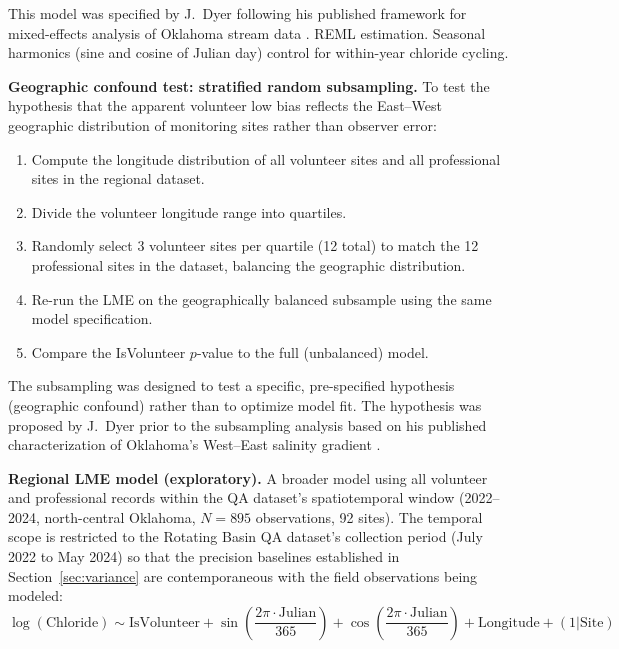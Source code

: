 \documentclass[lineno]{wlpeerj}
\begin{document}
This model was specified by J.\ Dyer \citep[personal communication, February 2026;][]{Dyer2026} following his published framework for mixed-effects analysis of Oklahoma stream data \citep{Dyer2025}. REML estimation. Seasonal harmonics (sine and cosine of Julian day) control for within-year chloride cycling.

\textbf{Geographic confound test: stratified random subsampling.} To test the hypothesis that the apparent volunteer low bias reflects the East--West geographic distribution of monitoring sites rather than observer error:

\begin{enumerate}
  \item Compute the longitude distribution of all volunteer sites and all professional sites in the regional dataset.
  \item Divide the volunteer longitude range into quartiles.
  \item Randomly select 3 volunteer sites per quartile (12 total) to match the 12 professional sites in the dataset, balancing the geographic distribution.
  \item Re-run the LME on the geographically balanced subsample using the same model specification.
  \item Compare the IsVolunteer $p$-value to the full (unbalanced) model.
\end{enumerate}

The subsampling was designed to test a specific, pre-specified hypothesis (geographic confound) rather than to optimize model fit. The hypothesis was proposed by J.\ Dyer prior to the subsampling analysis based on his published characterization of Oklahoma's West--East salinity gradient \citep{Dyer2025}.

\textbf{Regional LME model (exploratory).} A broader model using all volunteer and professional records within the QA dataset's spatiotemporal window (2022--2024, north-central Oklahoma, $N=895$ observations, 92 sites). The temporal scope is restricted to the Rotating Basin QA dataset's collection period (July 2022 to May 2024) so that the precision baselines established in Section~\ref{sec:variance} are contemporaneous with the field observations being modeled:
\begin{equation}
\log(\mathrm{Chloride}) \sim \mathrm{IsVolunteer} + \sin\!\left(\frac{2\pi \cdot \mathrm{Julian}}{365}\right) + \cos\!\left(\frac{2\pi \cdot \mathrm{Julian}}{365}\right) + \mathrm{Longitude} + (1|\mathrm{Site})
\label{eq:regionallme}
\end{equation}
\end{document}
